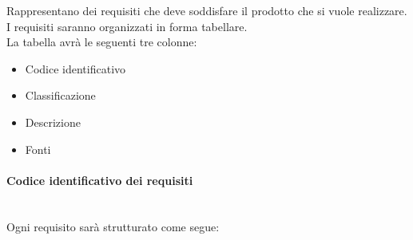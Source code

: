 \renewcommand{\o}{Obbligatorio}
\renewcommand{\d}{Desiderabile}
\newcommand{\op}{Opzionale}

Rappresentano dei requisiti che deve soddisfare il prodotto che si vuole realizzare.\\
I requisiti saranno organizzati in forma tabellare.\\
La tabella avrà le seguenti tre colonne:
\begin{itemize}
	\item Codice identificativo
	\item Classificazione
	\item Descrizione
	\item Fonti
\end{itemize}
\paragraph{Codice identificativo dei requisiti}\mbox{}\\
Ogni requisito sarà strutturato come segue:
